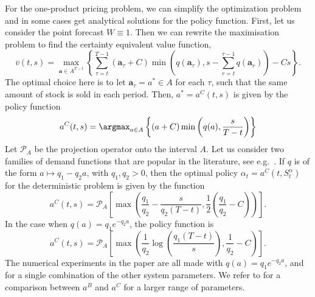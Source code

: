 \documentclass[main.tex]{subfiles}
\begin{document}
For the one-product pricing problem, we can simplify the optimization
problem and in some cases get analytical solutions for the policy function.
First, let us consider the point forecast
$W\equiv 1$.
Then we can rewrite the maximisation problem to find
the certainty equivalent value function,
\begin{equation}
  \overline{v}(t,s)=
  \max_{\mathbf a\in A^{T-t}}\left\{\sum_{\tau=t}^{T-1}(\mathbf
    a_\tau+C)\min\left(q(\mathbf a_\tau),s-\sum_{r=t}^{\tau-1}q(\mathbf a_r)\right)-Cs\right\}.
\end{equation}
The optimal choice here is to let $\mathbf a_\tau=a^*\in A$ for each
$\tau$, such that the same amount of stock is sold in each period.
Then, $a^*=a^C(t,s)$ is given by the policy function
\begin{equation}
  a^C(t,s)=\argmax_{a\in A} \left\{(a+C)\min\left(
      q(a),\frac{s}{T-t}
    \right)\right\}
\end{equation}
Let $\mathcal P_A$ be the projection operator onto the interval $A$.
Let us consider two families of demand functions that are
popular in the literature, see e.g.~\citep[Ch.~7]{talluri2006theory}.
If $q$ is of the form $a\mapsto q_1-q_2a$, with $q_1,q_2> 0$, then
the optimal policy $\alpha_t=a^C(t,S_t^\alpha)$ for the deterministic
problem is given by the function
\begin{equation}
  a^C(t,s)=\mathcal P_A \left[ \max\left(
      \frac{q_1}{q_2}-\frac{s}{q_2(T-t)},\frac{1}{2}\left(\frac{q_1}{q_2}-C
      \right) \right) \right].
\end{equation}
In the case when $q(a)=q_1e^{-q_2a}$, the policy function is
\begin{equation}\label{eq:cec_policy}
  a^C(t,s)=\mathcal P_A\left[
    \max\left( \frac{1}{q_2}\log\left( \frac{q_1(T-t)}{s}\right),
      \frac{1}{q_2}-C  \right)\right].
\end{equation}
The numerical experiments in the paper are all made
with $q(a)=q_1e^{-q_2a}$, and for a single combination of the other system
parameters. We refer to  for a
comparison between $a^B$ and $a^C$ for a larger range of parameters.

\end{document}
